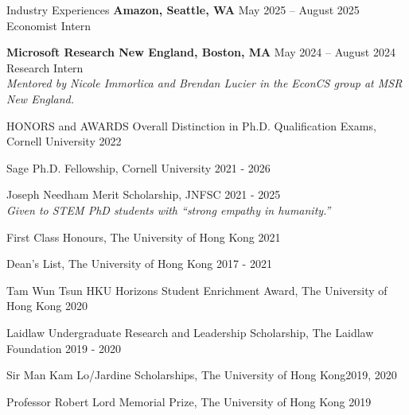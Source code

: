 \documentclass{resume} %
\begin{document}
\begin{rSection}{Industry Experiences}
  {\bf Amazon, Seattle, WA} \hfill {May 2025 -- August 2025} \\
  Economist Intern \vspace{-0.5em}

  {\bf Microsoft Research New England, Boston, MA} \hfill {May 2024 -- August 2024} \\
  Research Intern \\
  \emph{Mentored by Nicole Immorlica and Brendan Lucier in the EconCS group at MSR New England.}
  
\end{rSection}

\begin{rSection}{HONORS and AWARDS}
Overall Distinction in Ph.D. Qualification Exams, Cornell University \hfill 2022

Sage Ph.D. Fellowship, Cornell University \hfill 2021 - 2026

Joseph Needham Merit Scholarship, JNFSC \hfill 2021 - 2025 \\
\emph{Given to STEM PhD students with ``strong empathy in humanity.''}

First Class Honours, The University of Hong Kong \hfill 2021

Dean's List, The University of Hong Kong \hfill 2017 - 2021

Tam Wun Tsun HKU Horizons Student Enrichment Award, The University of Hong Kong \hfill 2020

Laidlaw Undergraduate Research and Leadership Scholarship, The Laidlaw Foundation \hfill 2019 - 2020

Sir Man Kam Lo/Jardine Scholarships, The University of Hong Kong\hfill 2019, 2020

Professor Robert Lord Memorial Prize, The University of Hong Kong \hfill 2019 

\end{rSection}
\end{document}
